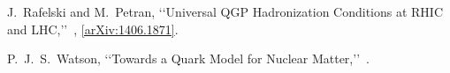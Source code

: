 \documentclass{appolb}
\begin{document}
\begin{thebibliography}{00}
 J.~Rafelski and M.~Petran,
\lq\lq Universal QGP Hadronization Conditions at RHIC and LHC,\rq\rq\ 
 ,
 \href{http://arxiv.org/abs/arXiv:1406.1871}{[arXiv:1406.1871]}.


 P.~J.~S.~Watson,
 \lq\lq Towards a Quark Model for Nuclear Matter,\rq\rq\ 
.






\end{thebibliography}
\end{document}
